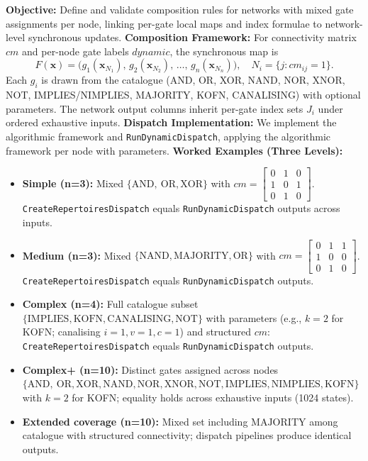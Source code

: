 \textbf{Objective:} Define and validate composition rules for networks with mixed gate assignments per node, linking per-gate local maps and index formulae to network-level synchronous updates.
\textbf{Composition Framework:} For connectivity matrix \(cm\) and per-node gate labels \(dynamic\), the synchronous map is
\[
F(\mathbf{x}) = \big(g_1(\mathbf{x}_{N_1}),\, g_2(\mathbf{x}_{N_2}),\,\dots,\, g_n(\mathbf{x}_{N_n})\big),\quad N_i=\{j: cm_{ij}=1\}.
\]
Each \(g_i\) is drawn from the catalogue (AND, OR, XOR, NAND, NOR, XNOR, NOT, IMPLIES/NIMPLIES, MAJORITY, KOFN, CANALISING) with optional parameters. The network output columns inherit per-gate index sets \(J_i\) under ordered exhaustive inputs.
\textbf{Dispatch Implementation:} We implement the algorithmic framework and \texttt{RunDynamicDispatch}, applying the algorithmic framework per node with parameters.
\textbf{Worked Examples (Three Levels):}
\begin{itemize}
\item \textbf{Simple (n=3):} Mixed \(\{\mathrm{AND},\ \mathrm{OR}, \mathrm{XOR}\}\) with \(cm = \begin{bmatrix}0&1&0\\1&0&1\\0&1&0\end{bmatrix}\). \texttt{CreateRepertoiresDispatch} equals \texttt{RunDynamicDispatch} outputs across inputs.
\item \textbf{Medium (n=3):} Mixed \(\{\mathrm{NAND}, \mathrm{MAJORITY}, \mathrm{OR}\}\) with \(cm = \begin{bmatrix}0&1&1\\1&0&0\\0&1&0\end{bmatrix}\). \texttt{CreateRepertoiresDispatch} equals \texttt{RunDynamicDispatch} outputs.
\item \textbf{Complex (n=4):} Full catalogue subset \(\{\mathrm{IMPLIES}, \mathrm{KOFN}, \mathrm{CANALISING}, \mathrm{NOT}\}\) with parameters (e.g., \(k=2\) for KOFN; canalising \(i=1, v=1, c=1\)) and structured \(cm\): \texttt{CreateRepertoiresDispatch} equals \texttt{RunDynamicDispatch} outputs.
\item \textbf{Complex+ (n=10):} Distinct gates assigned across nodes \(\{\mathrm{AND},\ \mathrm{OR}, \mathrm{XOR}, \mathrm{NAND}, \mathrm{NOR}, \mathrm{XNOR}, \mathrm{NOT}, \mathrm{IMPLIES}, \mathrm{NIMPLIES}, \mathrm{KOFN}\}\) with \(k=2\) for KOFN; equality holds across exhaustive inputs (1024 states).
\item \textbf{Extended coverage (n=10):} Mixed set including \(\mathrm{MAJORITY}\) among catalogue with structured connectivity; dispatch pipelines produce identical outputs.
\end{itemize}
